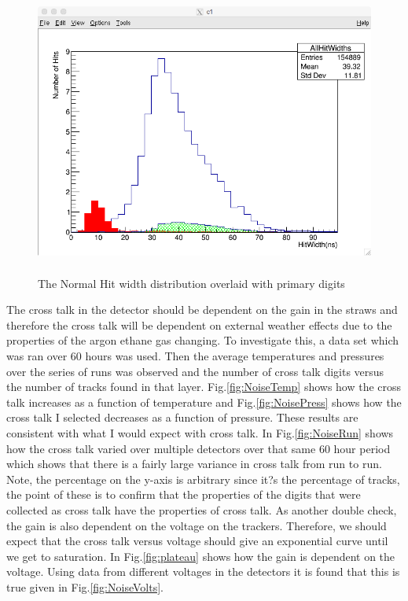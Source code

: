 \documentclass[./Thesis]{subfiles}
\begin{document}
\begin{figure}
	\centerline{\includegraphics[height=95mm]{HitWidthsXtalkComparison.png}}
	\caption[ HitWidth with cross talk and primary digits]{ The Normal Hit width distribution overlaid with primary digits }
	\label{fig:hitWidthAll}
\end{figure}

	
	
	The cross talk in the detector should be dependent on the gain in the straws and therefore the cross talk will be dependent on external weather effects due to the properties of the argon ethane gas changing.  To investigate this, a data set which was ran over 60 hours was used.  Then the average temperatures and pressures over the series of runs was observed and the number of cross talk digits versus the number of tracks found in that layer. Fig.\ref{fig:NoiseTemp} shows how the cross talk increases as a function of temperature and Fig.\ref{fig:NoisePress} shows how the cross talk I selected decreases as a function of pressure. These results are consistent with what I would expect with cross talk.  In Fig.\ref{fig:NoiseRun} shows how the cross talk varied over multiple detectors over that same 60 hour period which shows that there is a fairly large variance in cross talk from run to run. Note, the percentage on the y-axis is arbitrary since it?s the percentage of tracks, the point of these is to confirm that the properties of the digits that were collected as cross talk have the properties of cross talk.  As another double check, the gain is also dependent on the voltage on the trackers.  Therefore, we should expect that the cross talk versus voltage should give an exponential curve until we get to saturation.  In Fig.\ref{fig:plateau} shows how the gain is dependent on the voltage. Using data from different voltages in the detectors it is found that this is true given in Fig.\ref{fig:NoiseVolts}.	
	
\end{document}
